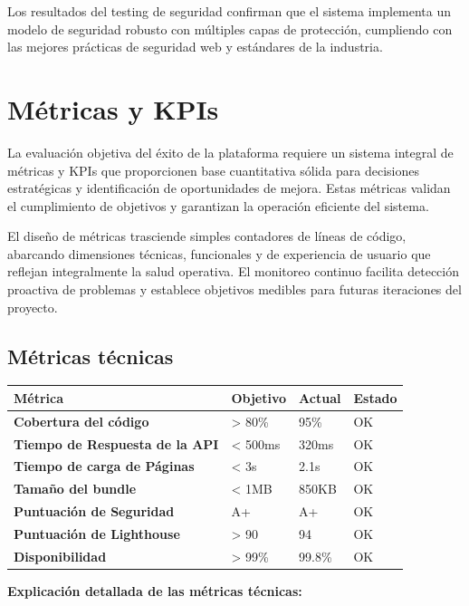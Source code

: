 \documentclass[12pt,a4paper,oneside]{report}
\begin{document}
Los resultados del testing de seguridad confirman que el sistema implementa un modelo de seguridad robusto con múltiples capas de protección, cumpliendo con las mejores prácticas de seguridad web y estándares de la industria.

\section{Métricas y KPIs}\label{muxe9tricas-y-kpis}

La evaluación objetiva del éxito de la plataforma requiere un sistema integral de métricas y KPIs que proporcionen base cuantitativa sólida para decisiones estratégicas y identificación de oportunidades de mejora. Estas métricas validan el cumplimiento de objetivos y garantizan la operación eficiente del sistema.

El diseño de métricas trasciende simples contadores de líneas de código, abarcando dimensiones técnicas, funcionales y de experiencia de usuario que reflejan integralmente la salud operativa. El monitoreo continuo facilita detección proactiva de problemas y establece objetivos medibles para futuras iteraciones del proyecto.

\subsection{Métricas técnicas}\label{muxe9tricas-tuxe9cnicas}

\begin{longtable}[]{@{}llll@{}}
\toprule\noalign{}
Métrica & Objetivo & Actual & Estado \\
\midrule\noalign{}
\endhead
\bottomrule\noalign{}
\endlastfoot
\textbf{Cobertura del código} & \textgreater{} 80\% & 95\% & OK \\
\textbf{Tiempo de Respuesta de la API} & \textless{} 500ms & 320ms & OK \\
\textbf{Tiempo de carga de Páginas} & \textless{} 3s & 2.1s & OK \\
\textbf{Tamaño del bundle} & \textless{} 1MB & 850KB & OK \\
\textbf{Puntuación de Seguridad} & A+ & A+ & OK \\
\textbf{Puntuación de Lighthouse} & \textgreater{} 90 & 94 & OK \\
\textbf{Disponibilidad} & \textgreater{} 99\% & 99.8\% & OK \\
\end{longtable}

\textbf{Explicación detallada de las métricas técnicas:}
\end{document}
